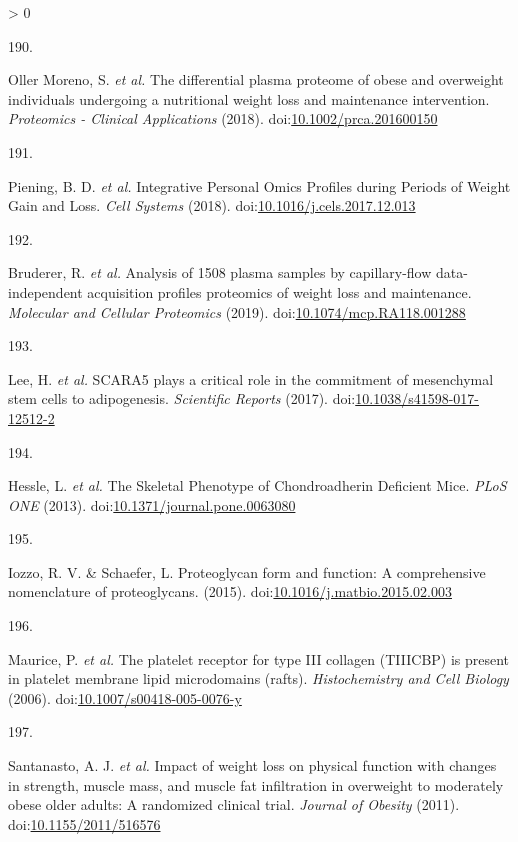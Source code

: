 \documentclass[11pt,twoside]{bristolthesis}
\newlength{\cslhangindent}
\newlength{\csllabelwidth}
\newenvironment{CSLReferences}[2] %
 {%
  \setlength{\parindent}{0pt}
  \ifodd #1 \everypar{\setlength{\hangindent}{\cslhangindent}}\ignorespaces\fi
  \ifnum #2 > 0
  \setlength{\parskip}{#2\baselineskip}
  \fi
 }%
 {}
\newcommand{\CSLLeftMargin}[1]{\parbox[t]{\csllabelwidth}{#1}}
\newcommand{\CSLRightInline}[1]{\parbox[t]{\linewidth - \csllabelwidth}{#1}\break}
\begin{document}
\begin{CSLReferences}{0}{0}
\leavevmode\hypertarget{ref-OllerMoreno2018}{}%
\CSLLeftMargin{190. }
\CSLRightInline{Oller Moreno, S. \emph{et al.} {The differential plasma proteome of obese and overweight individuals undergoing a nutritional weight loss and maintenance intervention}. \emph{Proteomics - Clinical Applications} (2018). doi:\href{https://doi.org/10.1002/prca.201600150}{10.1002/prca.201600150}}

\leavevmode\hypertarget{ref-Piening2018}{}%
\CSLLeftMargin{191. }
\CSLRightInline{Piening, B. D. \emph{et al.} {Integrative Personal Omics Profiles during Periods of Weight Gain and Loss}. \emph{Cell Systems} (2018). doi:\href{https://doi.org/10.1016/j.cels.2017.12.013}{10.1016/j.cels.2017.12.013}}

\leavevmode\hypertarget{ref-Bruderer2019}{}%
\CSLLeftMargin{192. }
\CSLRightInline{Bruderer, R. \emph{et al.} {Analysis of 1508 plasma samples by capillary-flow data-independent acquisition profiles proteomics of weight loss and maintenance}. \emph{Molecular and Cellular Proteomics} (2019). doi:\href{https://doi.org/10.1074/mcp.RA118.001288}{10.1074/mcp.RA118.001288}}

\leavevmode\hypertarget{ref-Lee2017a}{}%
\CSLLeftMargin{193. }
\CSLRightInline{Lee, H. \emph{et al.} {SCARA5 plays a critical role in the commitment of mesenchymal stem cells to adipogenesis}. \emph{Scientific Reports} (2017). doi:\href{https://doi.org/10.1038/s41598-017-12512-2}{10.1038/s41598-017-12512-2}}

\leavevmode\hypertarget{ref-Hessle2013}{}%
\CSLLeftMargin{194. }
\CSLRightInline{Hessle, L. \emph{et al.} {The Skeletal Phenotype of Chondroadherin Deficient Mice}. \emph{PLoS ONE} (2013). doi:\href{https://doi.org/10.1371/journal.pone.0063080}{10.1371/journal.pone.0063080}}

\leavevmode\hypertarget{ref-Iozzo2015}{}%
\CSLLeftMargin{195. }
\CSLRightInline{Iozzo, R. V. \& Schaefer, L. {Proteoglycan form and function: A comprehensive nomenclature of proteoglycans}. (2015). doi:\href{https://doi.org/10.1016/j.matbio.2015.02.003}{10.1016/j.matbio.2015.02.003}}

\leavevmode\hypertarget{ref-Maurice2006}{}%
\CSLLeftMargin{196. }
\CSLRightInline{Maurice, P. \emph{et al.} {The platelet receptor for type III collagen (TIIICBP) is present in platelet membrane lipid microdomains (rafts)}. \emph{Histochemistry and Cell Biology} (2006). doi:\href{https://doi.org/10.1007/s00418-005-0076-y}{10.1007/s00418-005-0076-y}}

\leavevmode\hypertarget{ref-Santanasto2011}{}%
\CSLLeftMargin{197. }
\CSLRightInline{Santanasto, A. J. \emph{et al.} {Impact of weight loss on physical function with changes in strength, muscle mass, and muscle fat infiltration in overweight to moderately obese older adults: A randomized clinical trial}. \emph{Journal of Obesity} (2011). doi:\href{https://doi.org/10.1155/2011/516576}{10.1155/2011/516576}}


\end{CSLReferences}
\end{document}
